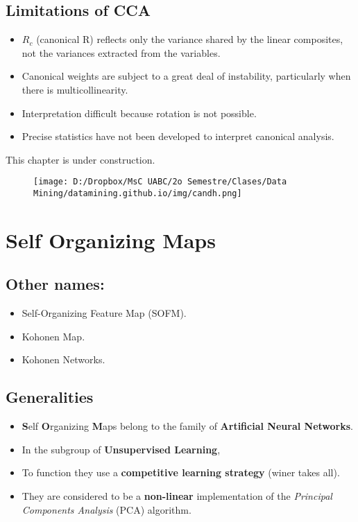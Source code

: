 \documentclass[]{book}
\providecommand{\tightlist}{%
  \setlength{\itemsep}{0pt}\setlength{\parskip}{0pt}}
\begin{document}
\section{Limitations of CCA}\label{limitations-of-cca}

\begin{itemize}
\tightlist
\item
  \(R_c\) (canonical R) reflects only the variance shared by the linear
  composites, not the variances extracted from the variables.
\item
  Canonical weights are subject to a great deal of instability,
  particularly when there is multicollinearity.
\item
  Interpretation difficult because rotation is not possible.
\item
  Precise statistics have not been developed to interpret canonical
  analysis.
\end{itemize}

This chapter is under construction.

\begin{figure}[htbp]
\centering
\texttt{[image: D:/Dropbox/MsC UABC/2o Semestre/Clases/Data Mining/datamining.github.io/img/candh.png]}
\caption{}
\end{figure}

\chapter{Self Organizing Maps}\label{self-organizing-maps}

\section{Other names:}\label{other-names}

\begin{itemize}
\tightlist
\item
  Self-Organizing Feature Map (SOFM).
\item
  Kohonen Map.
\item
  Kohonen Networks.
\end{itemize}

\section{Generalities}\label{generalities}

\begin{itemize}
\tightlist
\item
  \textbf{S}elf \textbf{O}rganizing \textbf{M}aps belong to the family
  of \textbf{Artificial Neural Networks}.
\item
  In the subgroup of \textbf{Unsupervised Learning},
\item
  To function they use a \textbf{competitive learning strategy} (winer
  takes all).
\item
  They are considered to be a \textbf{non-linear} implementation of the
  \emph{Principal Components Analysis} (PCA) algorithm. 
\end{itemize}
\end{document}
